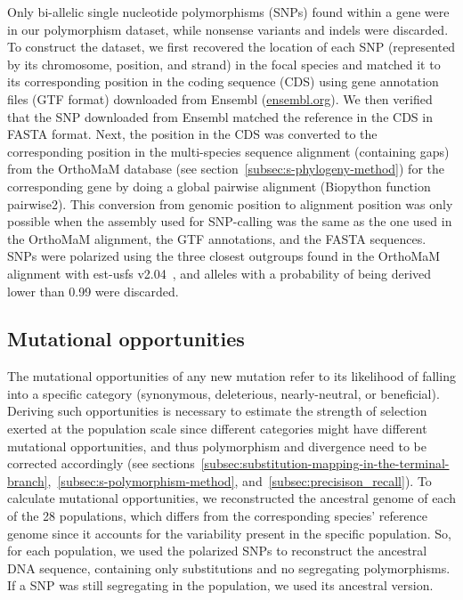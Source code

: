 \documentclass[12pt]{article}
\begin{document}
    Only bi-allelic single nucleotide polymorphisms (SNPs) found within a gene were in our polymorphism dataset, while nonsense variants and indels were discarded.
    To construct the dataset, we first recovered the location of each SNP (represented by its chromosome, position, and strand) in the focal species and matched it to its corresponding position in the coding sequence (CDS) using gene annotation files (GTF format) downloaded from Ensembl (\url{ensembl.org}).
    We then verified that the SNP downloaded from Ensembl matched the reference in the CDS in FASTA format.
    Next, the position in the CDS was converted to the corresponding position in the multi-species sequence alignment (containing gaps) from the OrthoMaM database (see section~\ref{subsec:s-phylogeny-method}) for the corresponding gene by doing a global pairwise alignment (Biopython function pairwise2).
    This conversion from genomic position to alignment position was only possible when the assembly used for SNP-calling was the same as the one used in the OrthoMaM alignment, the GTF annotations, and the FASTA sequences.
    SNPs were polarized using the three closest outgroups found in the OrthoMaM alignment with est-usfs v2.04~\cite{keightley_inferring_2018}, and alleles with a probability of being derived lower than 0.99 were discarded.

    \subsection{Mutational opportunities}
    \label{subsec:nunber-of-sites}
    The mutational opportunities of any new mutation refer to its likelihood of falling into a specific category (synonymous, deleterious, nearly-neutral, or beneficial).
    Deriving such opportunities is necessary to estimate the strength of selection exerted at the population scale since different categories might have different mutational opportunities, and thus polymorphism and divergence need to be corrected accordingly (see sections~\ref{subsec:substitution-mapping-in-the-terminal-branch},~\ref{subsec:s-polymorphism-method}, and~\ref{subsec:precisison_recall}).
    To calculate mutational opportunities, we reconstructed the ancestral genome of each of the 28 populations, which differs from the corresponding species' reference genome since it accounts for the variability present in the specific population.
    So, for each population, we used the polarized SNPs to reconstruct the ancestral DNA sequence, containing only substitutions and no segregating polymorphisms.
    If a SNP was still segregating in the population, we used its ancestral version.
\end{document}

